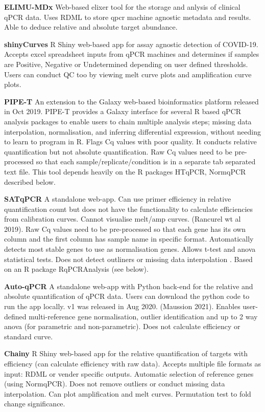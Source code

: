 \documentclass{SBCbookchapter}
\begin{document}
\textbf{ELIMU-MDx} Web-based elixer tool for the storage and anlysis of clinical qPCR data. Uses RDML to store qpcr machine agnostic metadata and results. Able to deduce relative and absolute target abundance.  \cite{Krahenbuhl2019}

\textbf{shinyCurves} R Shiny web-based app for assay agnostic detection of COVID-19. Accepts excel spreadsheet inputs from qPCR machines and determines if samples are Positive, Negative or Undetermined depending on user defined thresholds. Users can conduct QC too by viewing melt curve plots and amplification curve plots. \cite{OlaecheaLazaro2021}

\textbf{PIPE-T} An extension to the Galaxy web-based bioinformatics platform released in Oct 2019. PIPE-T provides a Galaxy interface for several R based qPCR analysis packages to enable users to chain multiple analysis steps; missing data interpolation, normalisation, and inferring differential expression, without needing to learn to program in R. Flags Cq values with poor quality. It conducts relative quantification but not absolute quantification. Raw Cq values need to be pre-processed so that each sample/replicate/condition is in a separate tab separated text file.  This tool depends heavily on the R packages HTqPCR, NormqPCR described below. \cite{Zanardi2019}

\textbf{SATqPCR} A standalone web-app. Can use primer efficiency in relative quantification count but does not have the functionality to calculate efficiencies from calibration curves. Cannot visualise melt/amp curves. (Rancurel wt al 2019). Raw Cq values need to be pre-processed so that each gene has its own column and the first column has sample name in specific format. Automatically detects most stable genes to use as normalisation genes. Allows t-test and anova statistical tests. Does not detect outliners or missing data interpolation \cite{Rancurel2019}. Based on an R package RqPCRAnalysis (see below).

\textbf{Auto-qPCR} A standalone web-app with Python back-end for the relative and absolute quantification of qPCR data. Users can download the python code to run the app locally. v1 was released in Aug 2020. (Maussion 2021). Enables user-defined multi-reference gene normalisation, outlier identification and up to 2 way anova (for parametric and non-parametric). Does not calculate efficiency or standard curve. \cite{Maussion2021}

\textbf{Chainy} R Shiny web-based app for the relative quantification of targets with efficiency (can calculate efficiency with raw data). Accepts multiple file formats as input: RDML or vender specific outputs. Automatic selection of reference genes (using NormqPCR). Does not remove outliers or conduct missing data interpolation. Can plot amplification and melt curves. Permutation test to fold change significance. \cite{Mallona2017}
\end{document}

